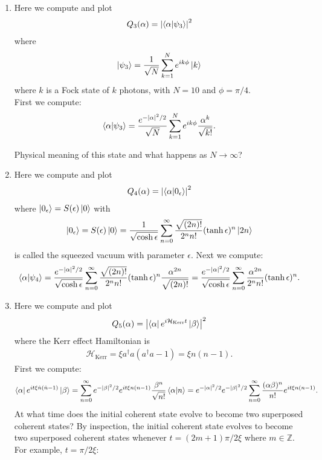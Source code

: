 \documentclass{article}
\theoremstyle{definition}
\newcommand{\ham}{\mathcal{H}}
\newcommand{\al}{\alpha}
\newcommand{\be}{\beta}
\newcommand{\f}[2]{\frac{#1}{#2}}
\begin{document}
\begin{enumerate}[label=\alph*)]
	
	\item Here we compute and plot 
	\begin{align*}
		Q_3(\al) = \abs{\braket{\al}{\psi_3}}^2
	\end{align*}
	where
	\begin{align*}
		\ket{\psi_3} = \f{1}{\sqrt{N}} \sum^N_{k=1} e^{ik\phi} \ket{k}
	\end{align*}
	where $k$ is a Fock state of $k$ photons, with $N=10$ and $\phi = \pi/4$. \\
	
	
	First we compute:
	\begin{align*}
		\braket{\al}{\psi_3} = \f{e^{-\abs{\al}^2/2}}{\sqrt{N}}\sum_{k=1}^N e^{ik\phi} \f{\al^k}{\sqrt{k!}}.
	\end{align*}


	Physical meaning of this state and what happens as $N\to \infty$?
	
	\item  Here we compute and plot 
	\begin{align*}
		Q_4(\al) = \abs{\braket{\al}{0_\epsilon}}^2
	\end{align*}
	where $\ket{0_\epsilon} = S(\epsilon)\ket{0}$ with
	\begin{align*}
		\ket{0_\epsilon} = S(\epsilon)\ket{0} = 
		\f{1}{\sqrt{\cosh \epsilon}} \sum_{n=0}^\infty \f{ \sqrt{(2n)!} }{2^n n!} (\tanh \epsilon)^n \ket{2n}
	\end{align*}
	is called the squeezed vacuum with parameter $\epsilon$. Next we compute:
	\begin{align*}
		\braket{\al}{\psi_4} = \f{e^{-\abs{\al}^2/2}}{\sqrt{\cosh \epsilon}} \sum_{n=0}^\infty \f{ \sqrt{(2n)!} }{2^n n!} (\tanh \epsilon)^n \f{\al^{2n}}{\sqrt{(2n)!}} = 
		\f{e^{-\abs{\al}^2/2}}{\sqrt{\cosh \epsilon}} \sum_{n=0}^\infty \f{ \al^{2n} }{2^n n!} (\tanh \epsilon)^n.
	\end{align*}
	
	\item Here we compute and plot 
	\begin{align*}
		Q_5(\al) = \abs{\bra{\al}  e^{i\ham_\text{Kerr} t}   \ket{\be}}^2
	\end{align*}
	where the Kerr effect Hamiltonian is 
	\begin{align*}
		\ham_\text{Kerr} = \xi a^\dagger a (a^\dagger a - 1) = \xi n(n-1).
	\end{align*}
	First we compute:
	\begin{align*}
		\bra{\al} e^{it\xi \hat{n} (\hat{n}-1)} \ket{\be} =  \sum_{n=0}^\infty e^{-\abs{\be}^2/2} e^{it\xi n(n-1)} \f{\be^n}{\sqrt{n!}} \braket{\al}{n} = e^{-\abs{\al}^2/2} e^{-\abs{\be}^2/2} \sum_{n=0}^\infty \f{(\al\be)^n}{n!} e^{it \xi n(n-1)}.
	\end{align*}	
	At what time does the initial coherent state evolve to become two superposed coherent states? By inspection, the initial coherent state evolves to become two superposed coherent states whenever $t = (2m+1) \pi / 2\xi$ where $m\in \mathbb{Z}$. For example, $t = \pi/2\xi$: \\
	

\end{enumerate}
\end{document}
